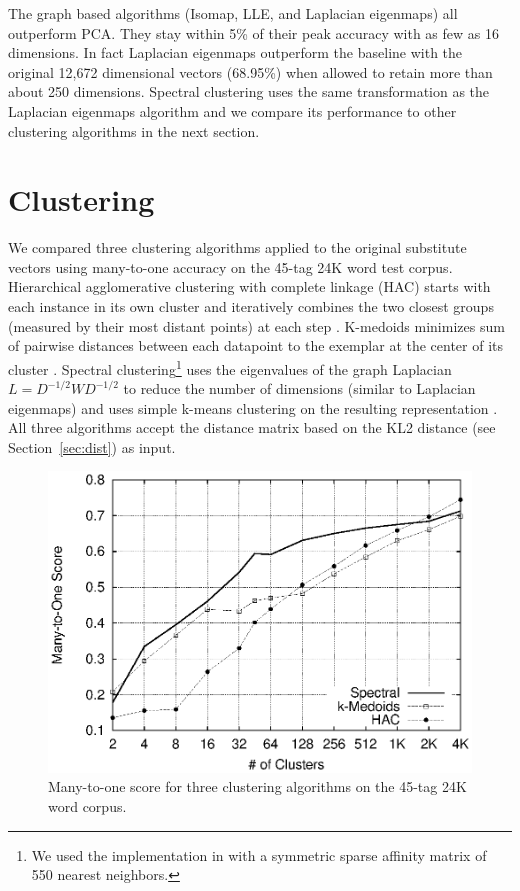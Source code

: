 \documentclass[11pt]{article}
\begin{document}
% 

The graph based algorithms (Isomap, LLE, and Laplacian eigenmaps) all
outperform PCA.  They stay within 5\% of their peak accuracy with as
few as 16 dimensions.  In fact Laplacian eigenmaps outperform the
baseline with the original 12,672 dimensional vectors (68.95\%) when
allowed to retain more than about 250 dimensions.  Spectral clustering
uses the same transformation as the Laplacian eigenmaps algorithm and
we compare its performance to other clustering algorithms in the next
section.

\section{Clustering}
\label{sec:clustering}

We compared three clustering algorithms applied to the original
substitute vectors using many-to-one accuracy on the 45-tag 24K word
test corpus.  Hierarchical agglomerative clustering with complete
linkage (HAC) starts with each instance in its own cluster and
iteratively combines the two closest groups (measured by their most
distant points) at each step \cite{manning2008introduction}.
K-medoids minimizes sum of pairwise distances between each datapoint
to the exemplar at the center of its cluster
\cite{kaufman2005finding}.  Spectral clustering\footnote{We used the
  implementation in \cite{chen2011parallel} with a symmetric sparse
  affinity matrix of 550 nearest neighbors.} uses the eigenvalues of
the graph Laplacian $L=D^{-1/2} W D^{-1/2}$ to reduce the number of
dimensions (similar to Laplacian eigenmaps) and uses simple k-means
clustering on the resulting representation \cite{ng2002spectral}.  All
three algorithms accept the distance matrix based on the KL2 distance
(see Section~\ref{sec:dist}) as input.

\begin{figure}[h]
\includegraphics[width=.5\textwidth]{clustering_graph_mono.eps}
\caption{Many-to-one score for three clustering algorithms on the
  45-tag 24K word corpus.}
\label{fig:clustering}
\end{figure}
\end{document}
